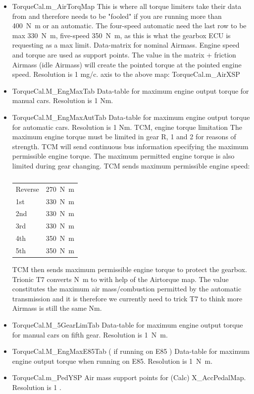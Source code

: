\documentclass[11pt,a4paper]{book}
\begin{document}
\begin{itemize}
    \item
TorqueCal.m\_AirTorqMap This is where all torque limiters take their data from
and therefore needs to be "fooled" if you are running more than
\SI{400}{\newton\meter} or an automatic.
The four-speed automatic need the last row to be max \SI{330}{\newton\meter},
five-speed \SI{350}{\newton\meter}, as this is what the gearbox ECU is
requesting as a max limit. Data-matrix for nominal Airmass. Engine speed and
torque are used as support points. The value in the matrix + friction Airmass
(idle Airmass) will create the pointed torque at the pointed engine speed.
Resolution is 1 mg/c. axis to the above map: TorqueCal.m\_AirXSP
    \item
TorqueCal.M\_EngMaxTab
Data-table for maximum engine output torque for manual cars. Resolution is 1 Nm.
    \item
TorqueCal.M\_EngMaxAutTab
Data-table for maximum engine output torque for automatic cars. Resolution is 1 Nm.
TCM, engine torque limitation
The maximum engine torque must be limited in gear R, 1 and 2 for reasons of strength. TCM will send
continuous bus information specifying the maximum permissible engine torque. The maximum
permitted engine torque is also limited during gear changing. TCM sends maximum permissible engine
speed:
\begin{table}
    \centering
    \begin{tabular}{ll}
        Reverse & \SI{270}{\newton\meter} \\
        1st & \SI{330}{\newton\meter} \\
        2nd & \SI{330}{\newton\meter} \\
        3rd & \SI{330}{\newton\meter} \\
        4th & \SI{350}{\newton\meter} \\
        5th & \SI{350}{\newton\meter}
    \end{tabular}
    \caption{}
    \label{tab:}
\end{table}
TCM then sends maximum permissible engine torque to protect the gearbox.
Trionic T7 converts \si{\newton\meter} to \si{\mgc} with help of the Airtorque map. The value constitutes
the maximum air mass/combustion permitted by the automatic transmission and it is therefore we
currently need to trick T7 to think more Airmass is still the same Nm.
    \item
TorqueCal.M\_5GearLimTab
Data-table for maximum engine output torque for manual cars on fifth gear.
Resolution is \SI{1}{\newton\meter}.
    \item
TorqueCal.M\_EngMaxE85Tab ( if running on E85 )
Data-table for maximum engine output torque when running on E85. Resolution is
\SI{1}{\newton\meter}.
    \item
TorqueCal.m\_PedYSP
Air mass support points for (Calc) X\_AccPedalMap. Resolution is 1 \si{\mgc}.
\end{itemize}
\end{document}
